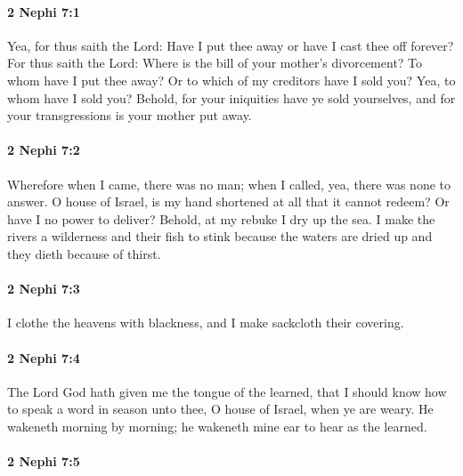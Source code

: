 		\paragraph{2 Nephi 7:1} %
			\label{2NEPHI-7-1}

			Yea, for thus saith the Lord:
			Have I put thee away or have I cast thee off forever?
			For thus saith the Lord:
			Where is the bill of your mother's divorcement?
			To whom have I put thee away?
			Or to which of my creditors have I sold you?
			Yea, to whom have I sold you?
			Behold, for your iniquities have ye sold yourselves,
			and for your transgressions is your mother put away.

		\paragraph{2 Nephi 7:2} %
			\label{2NEPHI-7-2}

			Wherefore when I came, there was no man;
			when I called, yea, there was none to answer.
			O house of Israel, is my hand shortened at all that it cannot redeem?
			Or have I no power to deliver?
			Behold, at my rebuke I dry up the sea.
			I make the rivers a wilderness and their fish to stink
			because the waters are dried up and they dieth because of thirst.

		\paragraph{2 Nephi 7:3} %
			\label{2NEPHI-7-3}

			I clothe the heavens with blackness,
			and I make sackcloth their covering.

		\paragraph{2 Nephi 7:4} %
			\label{2NEPHI-7-4}

			The Lord God hath given me the tongue of the learned,
			that I should know how to speak a word in season
			unto thee, O house of Israel, when ye are weary.
			He wakeneth morning by morning;
			he wakeneth mine ear to hear as the learned.

		\paragraph{2 Nephi 7:5} %
			\label{2NEPHI-7-5}

